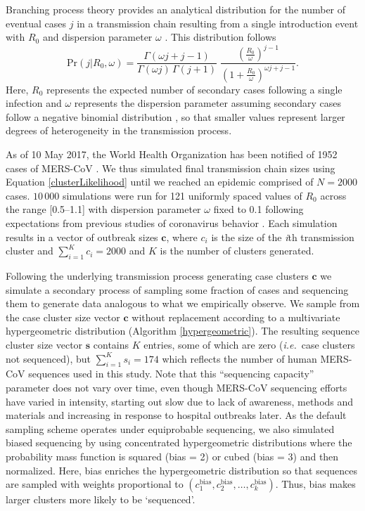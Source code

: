 \documentclass[9pt,lineno]{elife}
\begin{document}
Branching process theory provides an analytical distribution for the number of eventual cases $j$ in a transmission chain resulting from a single introduction event with $R_0$ and dispersion parameter $\omega$ \citep{blumberg_inference_2013}.
This distribution follows
\begin{equation}
\mathrm{Pr}(j | R_{0}, \omega) = \frac{\Gamma(\omega j+j-1)}{\Gamma(\omega j) \, \Gamma(j+1)} \; \frac{(\frac{R_{0}}{\omega})^{j-1}}{(1+\frac{R_{0}}{\omega})^{\omega j+j-1}}.
\label{clusterLikelihood}
\end{equation}
Here, $R_0$ represents the expected number of secondary cases following a single infection and $\omega$ represents the dispersion parameter assuming secondary cases follow a negative binomial distribution \citep{lloyd-smith_superspreading_2005}, so that smaller values represent larger degrees of heterogeneity in the transmission process.

As of 10 May 2017, the World Health Organization has been notified of 1952 cases of MERS-CoV \citep{who_mers_summary_2017}.
We thus simulated final transmission chain sizes using Equation \ref{clusterLikelihood} until we reached an epidemic comprised of $N=2000$ cases.
$10\,000$ simulations were run for 121 uniformly spaced values of $R_0$ across the range [0.5--1.1] with dispersion parameter $\omega$ fixed to 0.1 following expectations from previous studies of coronavirus behavior \citep{lloyd-smith_superspreading_2005}.
Each simulation results in a vector of outbreak sizes $\mathbf{c}$, where $c_i$ is the size of the \textit{i}th transmission cluster and $\sum_{i=1}^{K} c_i = 2000$ and $K$ is the number of clusters generated.

Following the underlying transmission process generating case clusters $\mathbf{c}$ we simulate a secondary process of sampling some fraction of cases and sequencing them to generate data analogous to what we empirically observe.
We sample from the case cluster size vector $\mathbf{c}$ without replacement according to a multivariate hypergeometric distribution (Algorithm \ref{hypergeometric}).
The resulting sequence cluster size vector $\mathbf{s}$ contains $K$ entries, some of which are zero (\textit{i.e.}\ case clusters not sequenced), but $\sum_{i=1}^{K} s_i = 174$ which reflects the number of human MERS-CoV sequences used in this study.
Note that this ``sequencing capacity'' parameter does not vary over time, even though MERS-CoV sequencing efforts have varied in intensity, starting out slow due to lack of awareness, methods and materials and increasing in response to hospital outbreaks later.
As the default sampling scheme operates under equiprobable sequencing, we also simulated biased sequencing by using concentrated hypergeometric distributions where the probability mass function is squared (bias = 2) or cubed (bias = 3) and then normalized.
Here, bias enriches the hypergeometric distribution so that sequences are sampled with weights proportional to $(c_1^\mathrm{bias}, c_2^\mathrm{bias}, \ldots, c_k^\mathrm{bias})$.
Thus, bias makes larger clusters more likely to be `sequenced'.
\end{document}
